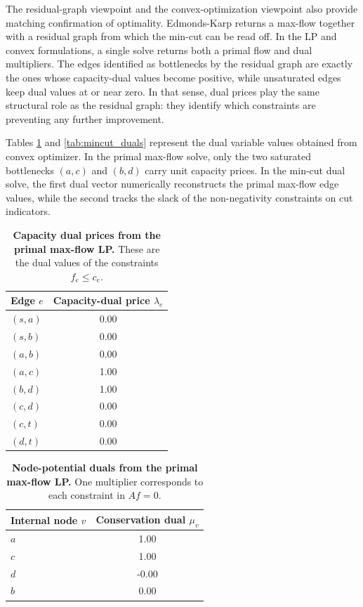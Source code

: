 \documentclass[12pt, openany]{article}
\begin{document}
The residual-graph viewpoint and the convex-optimization viewpoint also provide matching confirmation of optimality. Edmonds-Karp returns a max-flow together with a residual graph from which the min-cut can be read off. In the LP and convex formulations, a single solve returns both a primal flow and dual multipliers. The edges identified as bottlenecks by the residual graph are exactly the ones whose capacity-dual values become positive, while unsaturated edges keep dual values at or near zero. In that sense, dual prices play the same structural role as the residual graph: they identify which constraints are preventing any further improvement.

Tables \ref{tab:maxflow_capacity_duals} and \ref{tab:mincut_duals} represent the dual variable values obtained from convex optimizer. In the primal max-flow solve, only the two saturated bottlenecks \((a,c)\) and \((b,d)\) carry unit capacity prices. In the min-cut dual solve, the first dual vector numerically reconstructs the primal max-flow edge values, while the second tracks the slack of the non-negativity constraints on cut indicators.

\begin{table}[H]
    \centering
    \small
    \begin{tabular}{lc}
        \hline
        Edge \(e\) & Capacity-dual price \(\lambda_e\) \\
        \hline
        \((s,a)\) & 0.00 \\
        \((s,b)\) & 0.00 \\
        \((a,b)\) & 0.00 \\
        \((a,c)\) & 1.00 \\
        \((b,d)\) & 1.00 \\
        \((c,d)\) & 0.00 \\
        \((c,t)\) & 0.00 \\
        \((d,t)\) & 0.00 \\
        \hline
    \end{tabular}
    \caption{\textbf{Capacity dual prices from the primal max-flow LP.} These are the dual values of the constraints \(f_e \le c_e\).}
    \label{tab:maxflow_capacity_duals}
\end{table}

\begin{table}[H]
    \centering
    \small
    \begin{tabular}{lc}
        \hline
        Internal node \(v\) & Conservation dual \(\mu_v\) \\
        \hline
        \(a\) & 1.00 \\
        \(c\) & 1.00 \\
        \(d\) & -0.00 \\
        \(b\) & 0.00 \\
        \hline
    \end{tabular}
    \caption{\textbf{Node-potential duals from the primal max-flow LP.} One multiplier corresponds to each constraint in \(Af=0\).}
    \label{tab:maxflow_node_duals}
\end{table}
\end{document}
